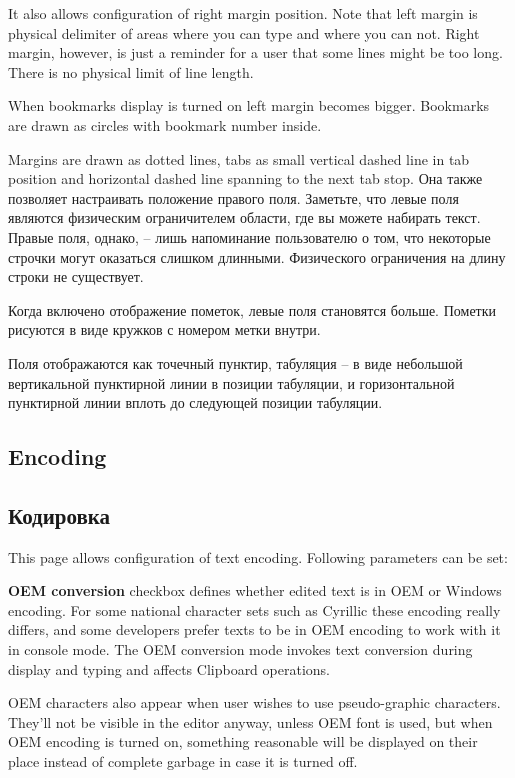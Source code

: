 \ifenglish
It also allows configuration of right margin position. Note that left margin
is physical delimiter of areas where you can type and where you can not. Right margin,
however, is just a reminder for a user that some lines might be too long.
There is no physical limit of line length.

When bookmarks display is turned on left margin becomes bigger. Bookmarks are
drawn as circles with bookmark number inside.

Margins are drawn as dotted lines, tabs as small vertical dashed line in tab
position and horizontal dashed line spanning to the next tab stop.
\else
Она также позволяет настраивать положение правого поля. Заметьте, что левые поля
являются физическим ограничителем области, где вы можете набирать текст. Правые
поля, однако, -- лишь напоминание пользователю о том, что некоторые строчки могут
оказаться слишком длинными. Физического ограничения на длину строки не существует.

Когда включено отображение пометок, левые поля становятся больше. Пометки рисуются
в виде кружков с номером метки внутри.

Поля отображаются как точечный пунктир, табуляция -- в виде небольшой вертикальной
пунктирной линии в позиции табуляции, и горизонтальной пунктирной линии вплоть до
следующей позиции табуляции.
\fi
\ifenglish
\subsection{Encoding}
\else
\subsection{Кодировка}
\fi
{}
\ifenglish
This page allows configuration of text encoding. Following parameters can be
set:

{\bf OEM conversion} checkbox defines whether edited text is in OEM or Windows encoding.
For some national character sets such as Cyrillic these encoding really differs,
and some developers prefer texts to be in OEM encoding to work with it in console mode.
The OEM conversion mode invokes text conversion during display and typing and
affects Clipboard operations.

OEM characters also appear when user wishes to use pseudo-graphic characters.
They'll not be visible in the editor anyway, unless OEM font is used, but when
OEM encoding is turned on, something reasonable will be displayed on their place
instead of complete garbage in case it is turned off.

